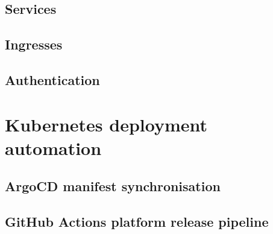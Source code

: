 \subsection{Services}
\subsection{Ingresses}
\subsection{Authentication}

\section{Kubernetes deployment automation}
\subsection{ArgoCD manifest synchronisation}
\subsection{GitHub Actions platform release pipeline}